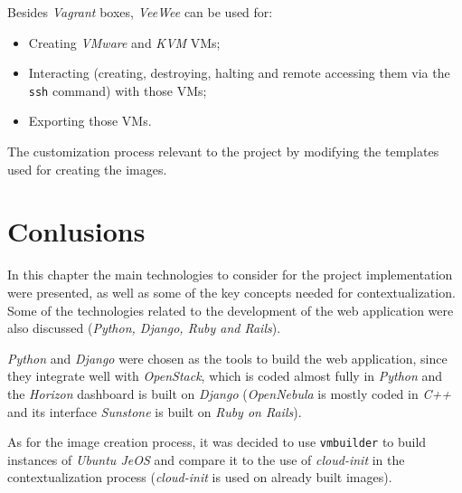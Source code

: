 Besides \textit{Vagrant} boxes, \textit{VeeWee} can be used for:

\begin{itemize}
\item Creating \textit{VMware} and \textit{KVM} VMs;
\item Interacting (creating, destroying, halting and remote accessing them via the \texttt{ssh} command) with those VMs;
\item Exporting those VMs.
\end{itemize}

The customization process relevant to the project by modifying the templates used for creating the images.

\section{Conlusions}\label{sota:concl}

In this chapter the main technologies to consider for the project implementation were presented, as well as some of the key concepts needed for contextualization. Some of the technologies related to the development of the web application were also discussed (\textit{Python, Django, Ruby and Rails}).

\textit{Python} and \textit{Django} were chosen as the tools to build the web application, since they integrate well with \textit{OpenStack}, which is coded almost fully in \textit{Python} and the \textit{Horizon} dashboard is built on \textit{Django} (\textit{OpenNebula} is mostly coded in \textit{C++} and its interface \textit{Sunstone} is built on \textit{Ruby on Rails}).

As for the image creation process, it was decided to use \texttt{vmbuilder} to build instances of \textit{Ubuntu JeOS} and compare it to the use of \textit{cloud-init} in the contextualization process (\textit{cloud-init} is used on already built images).
